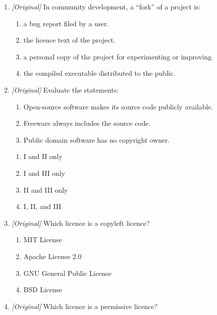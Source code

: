 \documentclass[11pt]{article}
\begin{document}
\begin{enumerate}[label=\textbf{Q\arabic*.}, leftmargin=*]
  hosts open-source code repositories?
  \begin{enumerate}[label=\Alph*.]
    \item GitHub
    \item Adobe Photoshop
    \item Microsoft Office
    \item Oracle Database
  \end{enumerate}
\item \textit{[Original]} In community development, a ``fork'' of a project is:
  \begin{enumerate}[label=\Alph*.]
    \item a bug report filed by a user.
    \item the licence text of the project.
    \item a personal copy of the project for experimenting or improving.
    \item the compiled executable distributed to the public.
  \end{enumerate}
\item \textit{[Original]} Evaluate the statements:
  \begin{enumerate}[label=\Roman*.]
    \item Open-source software makes its source code publicly available.
    \item Freeware always includes the source code.
    \item Public domain software has no copyright owner.
  \end{enumerate}
  \begin{enumerate}[label=\Alph*.]
    \item I and II only
    \item I and III only
    \item II and III only
    \item I, II, and III
  \end{enumerate}
\item \textit{[Original]} Which licence is a copyleft licence?
  \begin{enumerate}[label=\Alph*.]
    \item MIT License
    \item Apache License 2.0
    \item GNU General Public License
    \item BSD License
  \end{enumerate}
\item \textit{[Original]} Which licence is a permissive licence?
  \begin{enumerate}[label=\Alph*.]

\end{enumerate}
\end{enumerate}
\end{document}
